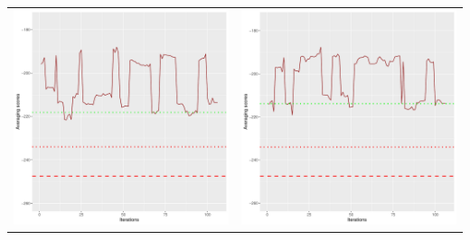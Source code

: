 \documentclass[]{scrartcl}
\begin{document}
\begin{table}[h!]
\begin{tabular}{cc}
\includegraphics[scale = 0.4]{./figs/asia/v2/10/avgBoundsEvolution-107.pdf} & 
\includegraphics[scale = 0.4]{./figs/asia/v2/20/avgBoundsEvolution-107.pdf} \\

\end{tabular}
\end{table}
\end{document}
